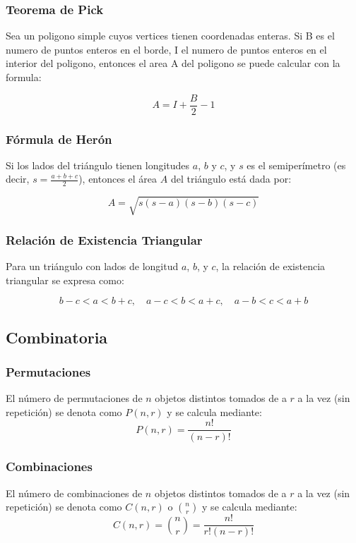 \subsubsection{Teorema de Pick}

Sea un poligono simple cuyos vertices tienen coordenadas enteras. Si B es el numero de puntos enteros en el borde, I el numero de puntos enteros en el interior del poligono, entonces el area A del poligono se puede calcular con la formula:

\[ A = I + \frac{B}{2} - 1 \]

\subsubsection{Fórmula de Herón}

Si los lados del triángulo tienen longitudes \(a\), \(b\) y \(c\), y \(s\) es el semiperímetro (es decir, \(s = \frac{a + b + c}{2}\)), entonces el área \(A\) del triángulo está dada por:

\[ A = \sqrt{s(s - a)(s - b)(s - c)} \]

\subsubsection{Relación de Existencia Triangular}

Para un triángulo con lados de longitud \(a\), \(b\), y \(c\), la relación de existencia triangular se expresa como:

\[ b - c < a < b + c, \quad a - c < b < a + c, \quad a - b < c < a + b \]

\subsection{Combinatoria}
\subsubsection{Permutaciones}
El número de permutaciones de $n$ objetos distintos tomados de a $r$ a la vez (sin repetición) se denota como $P(n, r)$ y se calcula mediante:
\[ P(n, r) = \frac{n!}{(n - r)!} \]

\subsubsection{Combinaciones}
El número de combinaciones de $n$ objetos distintos tomados de a $r$ a la vez (sin repetición) se denota como $C(n, r)$ o $\binom{n}{r}$ y se calcula mediante:
\[ C(n, r) = \binom{n}{r} = \frac{n!}{r!(n - r)!} \]

